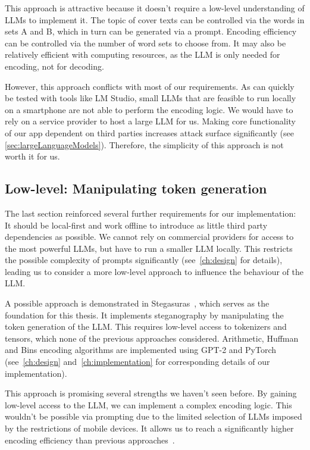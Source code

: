 This approach is attractive because it doesn't require a low-level understanding of \glspl{LLM} to implement it. The topic of cover texts can be controlled via the words in sets A and B, which in turn can be generated via a prompt. Encoding efficiency can be controlled via the number of word sets to choose from. It may also be relatively efficient with computing resources, as the \gls{LLM} is only needed for encoding, not for decoding.

However, this approach conflicts with most of our requirements. As can quickly be tested with tools like LM Studio, small \glspl{LLM} that are feasible to run locally on a smartphone are not able to perform the encoding logic. We would have to rely on a service provider to host a large \gls{LLM} for us. Making core functionality of our app dependent on third parties increases attack surface significantly (see \cref{sec:largeLanguageModels}). Therefore, the simplicity of this approach is not worth it for us.

\subsection{Low-level: Manipulating token generation}
\label{sec:lowLevelManipulatingTokenGeneration}
The last section reinforced several further requirements for our implementation: It should be local-first and work offline to introduce as little third party dependencies as possible. We cannot rely on commercial providers for access to the most powerful \glspl{LLM}, but have to run a smaller \gls{LLM} locally. This restricts the possible complexity of prompts significantly (see~\cref{ch:design} for details), leading us to consider a more low-level approach to influence the behaviour of the \gls{LLM}.

A possible approach is demonstrated in Stegasuras~\cite{zieglerNeuralLinguisticSteganography2019,zieglerHarvardnlpNeuralSteganography2025,zieglerStegasuras2025}, which serves as the foundation for this thesis. It implements steganography by manipulating the token generation of the \gls{LLM}. This requires low-level access to tokenizers and tensors, which none of the previous approaches considered. Arithmetic, Huffman and Bins encoding algorithms are implemented using GPT-2 and PyTorch (see~\cref{ch:design} and~\cref{ch:implementation} for corresponding details of our implementation).

This approach is promising several strengths we haven't seen before. By gaining low-level access to the \gls{LLM}, we can implement a complex encoding logic. This wouldn't be possible via prompting due to the limited selection of \glspl{LLM} imposed by the restrictions of mobile devices. It allows us to reach a significantly higher encoding efficiency than previous approaches~\cite{zieglerNeuralLinguisticSteganography2019}.

